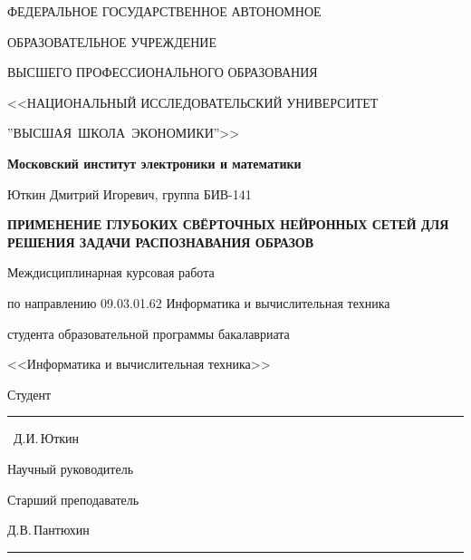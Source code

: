 \begin{titlepage}
    \begin{center}
        ФЕДЕРАЛЬНОЕ ГОСУДАРСТВЕННОЕ АВТОНОМНОЕ
        
        ОБРАЗОВАТЕЛЬНОЕ УЧРЕЖДЕНИЕ
        
        ВЫСШЕГО ПРОФЕССИОНАЛЬНОГО ОБРАЗОВАНИЯ
        
       <<НАЦИОНАЛЬНЫЙ ИССЛЕДОВАТЕЛЬСКИЙ УНИВЕРСИТЕТ
       
       ''ВЫСШАЯ~ШКОЛА~ЭКОНОМИКИ''>>
       \vspace{1cm}
 
        \textbf{Московский институт электроники и математики}
        
        Юткин Дмитрий Игоревич, группа БИВ-141
        \vspace{1cm}
        
        \textbf{\MakeUppercase{Применение глубоких свёрточных нейронных сетей для решения задачи распознавания образов}}
        \vspace{1cm}

        Междисциплинарная курсовая работа
        
        по направлению 09.03.01.62 Информатика и вычислительная техника 

        студента образовательной программы бакалавриата
        
        <<Информатика и вычислительная техника>>
        
    \end{center}
    \begin{flushright}
        Студент~\rule{4cm}{.1pt}~Д.И.\,Юткин
        \vspace{1cm}
        
        Научный руководитель

        Старший преподаватель

        Д.В.\,Пантюхин
        
        \rule{4cm}{.1pt}
    \end{flushright}
    \vfill{}
\end{titlepage}
